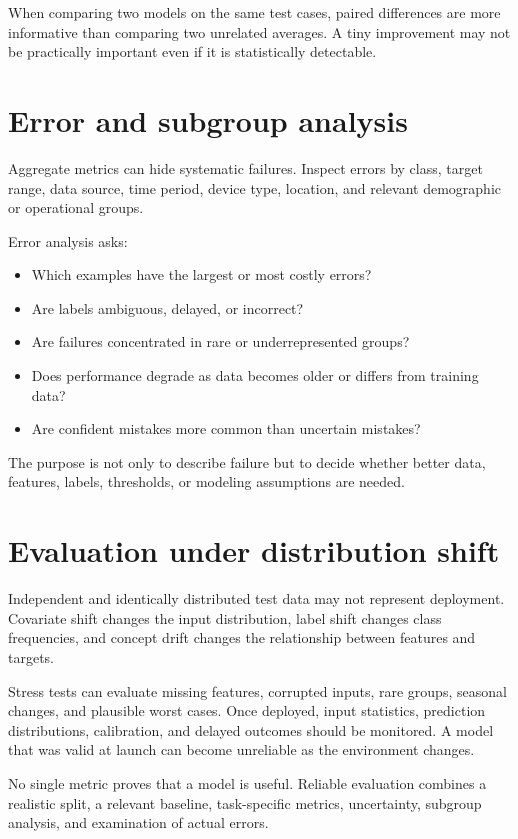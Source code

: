 When comparing two models on the same test cases, paired differences are more informative than comparing two unrelated averages. A tiny improvement may not be practically important even if it is statistically detectable.

\section{Error and subgroup analysis}

Aggregate metrics can hide systematic failures. Inspect errors by class, target range, data source, time period, device type, location, and relevant demographic or operational groups.

Error analysis asks:

\begin{itemize}
  \item Which examples have the largest or most costly errors?
  \item Are labels ambiguous, delayed, or incorrect?
  \item Are failures concentrated in rare or underrepresented groups?
  \item Does performance degrade as data becomes older or differs from training data?
  \item Are confident mistakes more common than uncertain mistakes?
\end{itemize}

The purpose is not only to describe failure but to decide whether better data, features, labels, thresholds, or modeling assumptions are needed.

\section{Evaluation under distribution shift}

Independent and identically distributed test data may not represent deployment. Covariate shift changes the input distribution, label shift changes class frequencies, and concept drift changes the relationship between features and targets.

Stress tests can evaluate missing features, corrupted inputs, rare groups, seasonal changes, and plausible worst cases. Once deployed, input statistics, prediction distributions, calibration, and delayed outcomes should be monitored. A model that was valid at launch can become unreliable as the environment changes.

\begin{keyidea}
No single metric proves that a model is useful. Reliable evaluation combines a realistic split, a relevant baseline, task-specific metrics, uncertainty, subgroup analysis, and examination of actual errors.
\end{keyidea}

